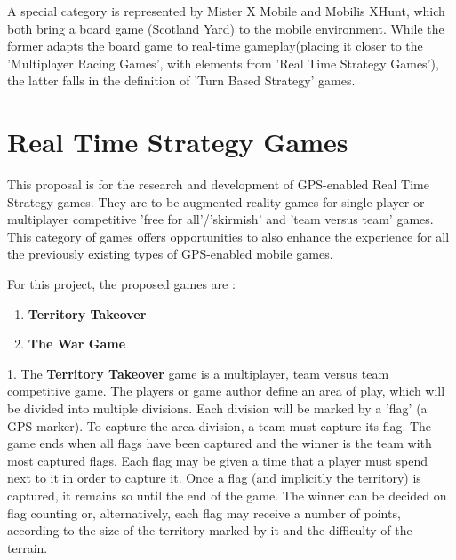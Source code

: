 \documentclass{article}
\begin{document}
A special category is represented by Mister X Mobile and Mobilis XHunt, which
both bring a board game (Scotland Yard) to the mobile environment. While the
former adapts the board game to real-time gameplay(placing it closer to the
'Multiplayer Racing Games', with elements from 'Real Time Strategy Games'), the
latter falls in the definition of 'Turn Based Strategy' games.

\section{Real Time Strategy Games}

This proposal is for the research and development of GPS-enabled Real Time
Strategy games. They are to be augmented reality games for single player or
multiplayer competitive 'free for all'/'skirmish' and 'team versus team'
games. This category of games offers opportunities to also enhance the
experience for all the previously existing types of GPS-enabled mobile games.

For this project, the proposed games are :
\begin{enumerate}	
	\item \textbf{Territory Takeover}
	\item \textbf{The War Game}
\end{enumerate}

1. The \textbf{Territory Takeover} game is a multiplayer, team versus team
competitive game. The players or game author define an area of play, which will
be divided into multiple divisions. Each division will be marked by a 'flag' (a
GPS marker). To capture the area division, a team must capture its flag. The
game ends when all flags have been captured and the winner is the team with most
captured flags. Each flag may be given a time that a player must spend next to
it in order to capture it. Once a flag (and implicitly the territory) is
captured, it remains so until the end of the game. The winner can be decided on
flag counting or, alternatively, each flag may receive a number of points,
according to the size of the territory marked by it and the difficulty of the
terrain. \newline
\end{document}
